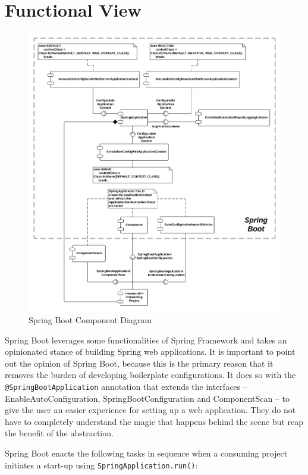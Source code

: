 \section{Functional View}

\begin{figure}[H]
    \centering
    \includegraphics[width=.9\textwidth]{content/architectural-views-top-level/spring-boot-component-diagram.png}
    \caption{Spring Boot Component Diagram}
    \label{component-diagram}
\end{figure}

Spring Boot leverages some functionalities of Spring Framework and takes an opinionated stance of building Spring web applications. It is important to point out the opinion of Spring Boot, because this is the primary reason that it removes the burden of developing boilerplate configurations.  It does so with the \texttt{@SpringBootApplication} annotation that extends the interfaces -- EnableAutoConfiguration, SpringBootConfiguration and ComponentScan -- to give the user an easier experience for setting up a web application. They do not have to completely understand the magic that happens behind the scene but reap the benefit of the abstraction.

Spring Boot enacts the following tasks in sequence when a consuming project initiates a start-up using \texttt{SpringApplication.run()}:

